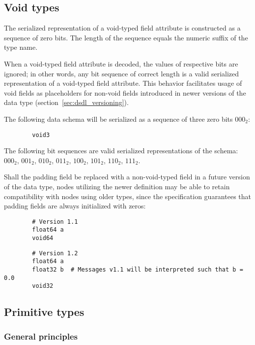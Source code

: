 \subsection{Void types}\label{sec:dsdl_serialized_void}

The serialized representation of a void-typed field attribute is constructed as a sequence of zero bits.
The length of the sequence equals the numeric suffix of the type name.

When a void-typed field attribute is decoded, the values of respective bits are ignored;
in other words, any bit sequence of correct length is a valid serialized representation
of a void-typed field attribute.
This behavior facilitates usage of void fields as placeholders for non-void fields
introduced in newer versions of the data type (section~\ref{sec:dsdl_versioning}).

\begin{remark}
    The following data schema will be serialized as a sequence of three zero bits $000_2$:
    \begin{verbatim}
        void3
    \end{verbatim}
    The following bit sequences are valid serialized representations of the schema:
    $000_2$,
    $001_2$,
    $010_2$,
    $011_2$,
    $100_2$,
    $101_2$,
    $110_2$,
    $111_2$.

    Shall the padding field be replaced with a non-void-typed field in a future version of the data type,
    nodes utilizing the newer definition may be able to retain compatibility with nodes using older types,
    since the specification guarantees that padding fields are always initialized with zeros:

    \begin{verbatim}
        # Version 1.1
        float64 a
        void64
    \end{verbatim}

    \begin{verbatim}
        # Version 1.2
        float64 a
        float32 b  # Messages v1.1 will be interpreted such that b = 0.0
        void32
    \end{verbatim}
\end{remark}

\subsection{Primitive types}

\subsubsection{General principles}

